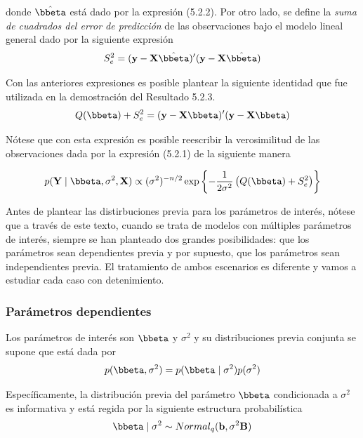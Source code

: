 donde $\hat{\bbeta}$ está dado por la expresión (5.2.2). Por otro lado, se define la \emph{suma de cuadrados del error de predicción} de las observaciones bajo el modelo lineal general dado por la siguiente expresión
\begin{equation}
S^2_e=(\mathbf{y}-\mathbf{X}\hat{\bbeta})'(\mathbf{y}-\mathbf{X}\hat{\bbeta})
\end{equation}

Con las anteriores expresiones es posible plantear la siguiente identidad que fue utilizada en la demostración del Resultado 5.2.3.
\begin{equation}
Q(\bbeta)+S^2_e=(\mathbf{y}-\mathbf{X}\bbeta)'(\mathbf{y}-\mathbf{X}\bbeta)
\end{equation}

Nótese que con esta expresión es posible reescribir la verosimilitud de las observaciones dada por la expresión (5.2.1) de la siguiente manera

\begin{equation}
p(\mathbf{Y} \mid \bbeta,\sigma^2,\mathbf{X})\propto (\sigma^2)^{-n/2} \exp\left\{-\frac{1}{2\sigma^2}\left(Q(\bbeta)+S^2_e\right)\right\}
\end{equation}

Antes de plantear las distirbuciones previa para los parámetros de interés, nótese que a través de este texto, cuando se trata de modelos con múltiples parámetros de interés, siempre se han planteado dos grandes posibilidades: que los parámetros sean dependientes previa y por supuesto, que los parámetros sean independientes previa. El tratamiento de ambos escenarios es diferente y vamos a estudiar cada caso con detenimiento.

\subsubsection*{Parámetros dependientes}

Los parámetros de interés son $\bbeta$ y $\sigma^2$ y su distribuciones previa conjunta se supone que está dada por
\begin{equation*}
p(\bbeta,\sigma^2)=p(\bbeta \mid \sigma^2)p(\sigma^2)
\end{equation*}

Específicamente, la distribución previa del parámetro $\bbeta$ condicionada a $\sigma^2$ es informativa y está regida por la siguiente estructura probabilística
\begin{equation*}
\bbeta \mid \sigma^2 \sim Normal_q(\mathbf{b},\sigma^2\mathbf{B})
\end{equation*}

